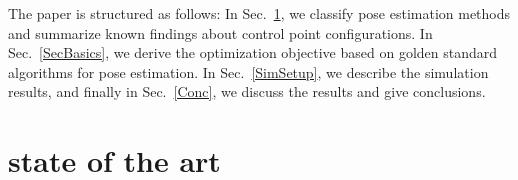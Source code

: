 \documentclass[letterpaper, 10 pt, conference]{ieeeconf}  %
\begin{document}
	
	
	
	
	
	The paper is structured as follows:  In Sec.~\ref{state_of_the_art}, we classify pose estimation methods and summarize known findings about control point configurations. In Sec.~\ref{SecBasics}, we derive the optimization objective based on golden standard algorithms for pose estimation. In Sec.~\ref{SimSetup}, we describe the simulation results, and finally in Sec.~\ref{Conc}, we discuss the results and give conclusions.
	
	\section{state of the art}
	\label{state_of_the_art}
\end{document}
